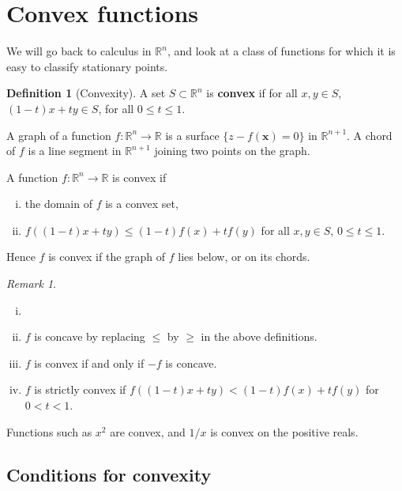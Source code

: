 \documentclass[12pt]{article}
\theoremstyle{definition}
\newtheorem{definition}{Definition}[section]
\theoremstyle{remark}
\newtheorem*{remark}{Remark}
\begin{document}
\newpage

\section{Convex functions}%
\label{sec:convex_functions}

We will go back to calculus in $\mathbb{R}^{n}$, and look at a class of functions for which it is easy to classify stationary points.

\begin{definition}[Convexity]
	A set $S \subset \mathbb{R}^{n}$ is \textbf{convex} if for all $x, y \in S$, $(1 - t)x + ty \in S$, for all $0 \leq t \leq 1$.

	A graph of a function $f : \mathbb{R}^{n} \to \mathbb{R}$ is a surface $\{z - f(\mathbf{x}) = 0\}$ in $\mathbb{R}^{n + 1}$. A chord of $f$ is a line segment in $\mathbb{R}^{n+1}$ joining two points on the graph.

	A function $f : \mathbb{R}^{n} \to \mathbb{R}$ is convex if
	\begin{enumerate}[(i)]
		\item the domain of $f$ is a convex set,
		\item $f((1 - t)x + ty) \leq (1 - t)f(x) + tf(y)$ for all $x, y \in S$, $0 \leq t \leq 1$.
	\end{enumerate}
	Hence $f$ is convex if the graph of $f$ lies below, or on its chords.
\end{definition}

\begin{remark}
	\begin{enumerate}[(i)]
		\item[]
		\item $f$ is concave by replacing $\leq$ by $\geq$ in the above definitions.
		\item $f$ is convex if and only if $-f$ is concave.
		\item $f$ is strictly convex if $f((1 - t)x + ty) < (1 - t)f(x) + tf(y)$ for $0 < t < 1$.
	\end{enumerate}
	
\end{remark}

Functions such as $x^2$ are convex, and $1/x$ is convex on the positive reals.

\subsection{Conditions for convexity}%
\label{sub:conditions_for_convexity}
\end{document}
